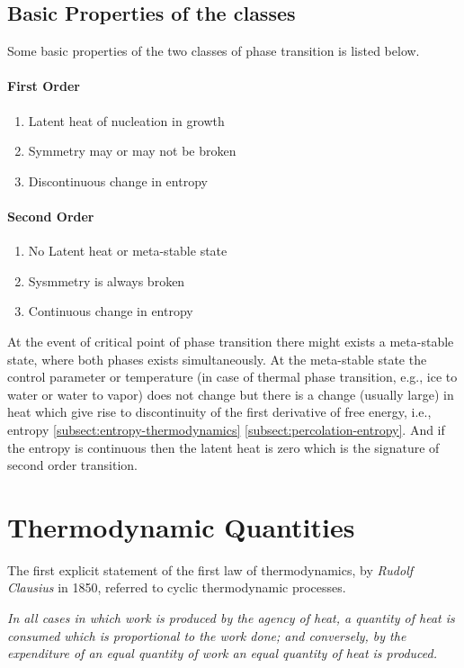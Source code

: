 	\subsection{Basic Properties of the classes}
	Some basic properties of the two classes of phase transition is listed below.
	\paragraph{First Order}
		\begin{enumerate}
			\item Latent heat of nucleation in growth
			\item Symmetry may or may not be broken
			\item Discontinuous change in entropy
		\end{enumerate}
	
	\paragraph{Second Order}
		\begin{enumerate}
			\item No Latent heat or meta-stable state
			\item Sysmmetry is always broken
			\item Continuous change in entropy
		\end{enumerate}
	At the event of critical point of phase transition there might exists a meta-stable state, where both phases exists simultaneously. At the meta-stable state the control parameter or temperature (in case of thermal phase transition, e.g., ice to water or water to vapor) does not change but there is a change (usually large) in heat which give rise to discontinuity of the first derivative of free energy, i.e., entropy \ref{subsect:entropy-thermodynamics} \ref{subsect:percolation-entropy}. And if the entropy is continuous then the latent heat is zero which is the signature of second order transition.

	
	
\section{Thermodynamic Quantities}
	The first explicit statement of the first law of thermodynamics, by \textit{Rudolf Clausius} in 1850, referred to cyclic thermodynamic processes.
	
	
	\textit{In all cases in which work is produced by the agency of heat, a quantity of heat is consumed which is proportional to the work done; and conversely, by the expenditure of an equal quantity of work an equal quantity of heat is produced.}
	
